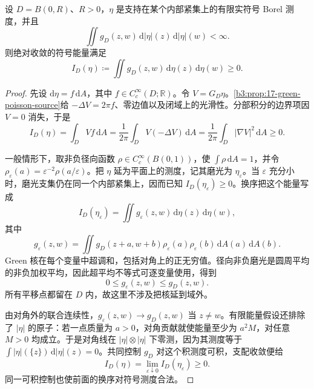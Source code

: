\begin{lemma}\label{b3:lem:17-disk-energy-positive}
设 \(D=B(0,R)\)、\(R>0\)，\(\eta\) 是支持在某个内部紧集上的有限实符号 Borel 测度，并且
\[
 \iint g_D(z,w)\,\mathrm d|\eta|(z)\,\mathrm d|\eta|(w)<\infty.
\]
则绝对收敛的符号能量满足
\[
 I_D(\eta)\coloneqq\iint g_D(z,w)\,\mathrm d\eta(z)\,\mathrm d\eta(w)\ge0.
\]
\end{lemma}
\begin{proof}
先设 \(\mathrm d\eta=f\,\mathrm dA\)，其中 \(f\in C_c^\infty(D;\mathbb R)\)。令 \(V=G_D\eta\)。\cref{b3:prop:17-green-poisson-source}给 \(-\Delta V=2\pi f\)、零边值以及闭域上的光滑性。分部积分的边界项因 \(V=0\) 消失，于是
\[
 I_D(\eta)=\int_DVf\,\mathrm dA
 =\frac1{2\pi}\int_DV(-\Delta V)\,\mathrm dA
 =\frac1{2\pi}\int_D|\nabla V|^2\,\mathrm dA\ge0.
\]

一般情形下，取非负径向函数 \(\rho\in C_c^\infty(B(0,1))\)，使 \(\int\rho\,\mathrm dA=1\)，并令 \(\rho_\varepsilon(a)=\varepsilon^{-2}\rho(a/\varepsilon)\)。把 \(\eta\) 延为平面上的测度，记其磨光为 \(\eta_\varepsilon\)。当 \(\varepsilon\) 充分小时，磨光支集仍在同一个内部紧集上，因而已知 \(I_D(\eta_\varepsilon)\ge0\)。换序把这个能量写成
\[
 I_D(\eta_\varepsilon)=\iint g_\varepsilon(z,w)\,\mathrm d\eta(z)\,\mathrm d\eta(w),
\]
其中
\[
 g_\varepsilon(z,w)
 =\iint g_D(z+a,w+b)\rho_\varepsilon(a)\rho_\varepsilon(b)
            \,\mathrm dA(a)\,\mathrm dA(b).
\]
Green 核在每个变量中超调和，包括对角上的正无穷值。径向非负磨光是圆周平均的非负加权平均，因此超平均不等式可逐变量使用，得到
\[
 0\le g_\varepsilon(z,w)\le g_D(z,w).
\]
所有平移点都留在 \(D\) 内，故这里不涉及把核延到域外。

由对角外的联合连续性，\(g_\varepsilon(z,w)\to g_D(z,w)\) 当 \(z\ne w\)。有限能量假设还排除了 \(|\eta|\) 的原子：若一点质量为 \(a>0\)，对角贡献就使能量至少为 \(a^2M\)，对任意 \(M>0\) 均成立。于是对角线在 \(|\eta|\otimes|\eta|\) 下零测，因为其测度等于 \(\int|\eta|(\{z\})\,\mathrm d|\eta|(z)=0\)。共同控制 \(g_D\) 对这个积测度可积，支配收敛便给
\[
 I_D(\eta)=\lim_{\varepsilon\downarrow0}I_D(\eta_\varepsilon)\ge0.
\]
同一可积控制也使前面的换序对符号测度合法。
\end{proof}

